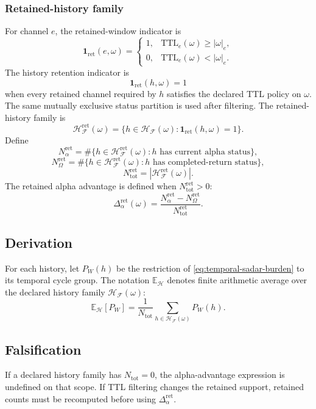 \subsubsection{Retained-history family}
\label{app:stoch-retained-history-family}
For channel \(e\), the retained-window indicator is
\[
\mathbf 1_{\mathrm{ret}}(e,\omega)=
\begin{cases}
1, & \mathrm{TTL}_e(\omega)\ge |\omega|_e,\\
0, & \mathrm{TTL}_e(\omega)< |\omega|_e.
\end{cases}
\]
The history retention indicator is
\[
\mathbf 1_{\mathrm{ret}}(h,\omega)=1
\]
when every retained channel required by \(h\) satisfies the declared TTL policy on \(\omega\). The same mutually exclusive status partition is used after filtering. The retained-history family is
\[
\mathcal H_{\mathcal F}^{\mathrm{ret}}(\omega)
=
\{h\in\mathcal H_{\mathcal F}(\omega):
\mathbf 1_{\mathrm{ret}}(h,\omega)=1\}.
\]
Define
\[
N_{\alpha}^{\mathrm{ret}}
=
\#\{h\in\mathcal H_{\mathcal F}^{\mathrm{ret}}(\omega):
h\text{ has current alpha status}\},
\]
\[
N_{\Omega}^{\mathrm{ret}}
=
\#\{h\in\mathcal H_{\mathcal F}^{\mathrm{ret}}(\omega):
h\text{ has completed-return status}\},
\]
\[
N_{\mathrm{tot}}^{\mathrm{ret}}
=
|\mathcal H_{\mathcal F}^{\mathrm{ret}}(\omega)|.
\]
The retained alpha advantage is defined when \(N_{\mathrm{tot}}^{\mathrm{ret}}>0\):
\begin{equation}
\Delta_{\alpha}^{\mathrm{ret}}(\omega)
=
\frac{N_{\alpha}^{\mathrm{ret}}-N_{\Omega}^{\mathrm{ret}}}{N_{\mathrm{tot}}^{\mathrm{ret}}}.
\label{app:stochastic:eq:ret-alpha-advantage}
\end{equation}

\subsection{Derivation}
\label{app:stoch-derivation}
For each history, let \(P_W(h)\) be the restriction of
\eqref{eq:temporal-sadar-burden} to its temporal cycle group.
The notation \(\mathbb E_{\mathcal H}\) denotes finite arithmetic average over the declared history family \(\mathcal H_{\mathcal F}(\omega)\):
\[
\mathbb E_{\mathcal H}[P_W]
=
\frac{1}{N_{\mathrm{tot}}}
\sum_{h\in\mathcal H_{\mathcal F}(\omega)}
P_W(h).
\]

\subsection{Falsification}
\label{app:stoch-falsification}
If a declared history family has \(N_{\mathrm{tot}}=0\), the alpha-advantage expression is undefined on that scope. If TTL filtering changes the retained support, retained counts must be recomputed before using \(\Delta_{\alpha}^{\mathrm{ret}}\).



